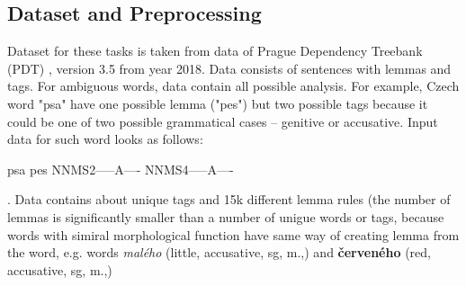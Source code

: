 


\subsection{Dataset and Preprocessing}
\label{sub:dataset}
Dataset for these tasks is taken from data of Prague Dependency Treebank (PDT) \citep{PDT35}, version 3.5 from year 2018. %
Data consists of sentences with lemmas and tags. For ambiguous words, data contain all possible analysis. For example, Czech word "psa" have one possible lemma ("pes") but two possible tags because it could be one of two possible grammatical cases -- genitive or accusative. Input data for such word looks as follows: \\
\begin{center}
psa pes NNMS2-----A---- NNMS4-----A----
\end{center}.
Data contains about %
unique tags and 15k different lemma rules (the number of lemmas is significantly smaller than a number of unigue words or tags, because words with simiral morphological function have same way of creating lemma from the word, e.g. words \textit{malého} (little, accusative,  sg, m.,) and \textbf{červeného}  (red, accusative,  sg, m.,)  %

